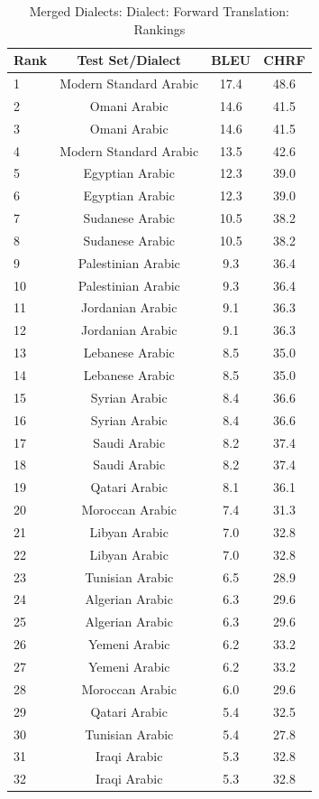 \begin{table}[htbp]
\centering
\caption{Merged Dialects: Dialect: Forward Translation: Rankings}
\label{tab:testset_ranking_forward_merged_dialect}
\begin{tabular}{l@{\hspace{3pt}}c@{\hspace{3pt}}c@{\hspace{3pt}}c}
\toprule
Rank & Test Set/Dialect & BLEU & CHRF \\
\midrule
1 & Modern Standard Arabic  & 17.4 & 48.6 \\
2 & Omani Arabic & 14.6 & 41.5 \\
3 & Omani Arabic  & 14.6 & 41.5 \\
4 & Modern Standard Arabic & 13.5 & 42.6 \\
5 & Egyptian Arabic & 12.3 & 39.0 \\
6 & Egyptian Arabic  & 12.3 & 39.0 \\
7 & Sudanese Arabic & 10.5 & 38.2 \\
8 & Sudanese Arabic  & 10.5 & 38.2 \\
9 & Palestinian Arabic & 9.3 & 36.4 \\
10 & Palestinian Arabic  & 9.3 & 36.4 \\
11 & Jordanian Arabic & 9.1 & 36.3 \\
12 & Jordanian Arabic  & 9.1 & 36.3 \\
13 & Lebanese Arabic & 8.5 & 35.0 \\
14 & Lebanese Arabic  & 8.5 & 35.0 \\
15 & Syrian Arabic & 8.4 & 36.6 \\
16 & Syrian Arabic  & 8.4 & 36.6 \\
17 & Saudi Arabic & 8.2 & 37.4 \\
18 & Saudi Arabic  & 8.2 & 37.4 \\
19 & Qatari Arabic  & 8.1 & 36.1 \\
20 & Moroccan Arabic  & 7.4 & 31.3 \\
21 & Libyan Arabic & 7.0 & 32.8 \\
22 & Libyan Arabic  & 7.0 & 32.8 \\
23 & Tunisian Arabic  & 6.5 & 28.9 \\
24 & Algerian Arabic & 6.3 & 29.6 \\
25 & Algerian Arabic  & 6.3 & 29.6 \\
26 & Yemeni Arabic & 6.2 & 33.2 \\
27 & Yemeni Arabic  & 6.2 & 33.2 \\
28 & Moroccan Arabic & 6.0 & 29.6 \\
29 & Qatari Arabic & 5.4 & 32.5 \\
30 & Tunisian Arabic & 5.4 & 27.8 \\
31 & Iraqi Arabic & 5.3 & 32.8 \\
32 & Iraqi Arabic  & 5.3 & 32.8 \\
\bottomrule
\end{tabular}
\end{table}